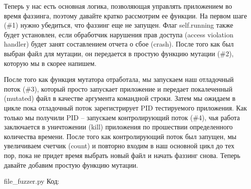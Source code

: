 \documentclass[12pt]{book}
\begin{document}



    
Теперь у нас есть основная логика, позволяющая управлять приложением во время фаззинга, поэтому давайте кратко рассмотрим ее функции. На первом шаге (\#1) нужно убедиться, что фаззинг еще не запущен. Флаг self.running также будет установлен, если обработчик нарушения прав доступа (access violation handler) будет занят составлением отчета о сбое (crash). После того как был выбран файл для мутации, он передается в простую функцию мутации (\#2), которую мы в скорее напишем.

После того как функция мутатора отработала, мы запускаем наш отладочный поток (\#3), который просто запускает приложение и передает покалеченный (mutated) файл в качестве аргумента командной строки. Затем мы ожидаем в цикле пока отладочный поток зарегистрирует PID тестируемого приложения. Как только мы получили PID – запускаем контролирующий поток (\#4), чья работа заключается в уничтожении (kill) приложения по прошествии определенного количества времени. После того как контролирующий поток был запущен, мы увеличиваем счетчик (count) и повторно входим в наш основной цикл до тех пор, пока не придет время выбрать новый файл и начать фаззинг снова. Теперь давайте добавим простую функцию мутации.

file\_fuzzer.py
Код:



\end{document}
